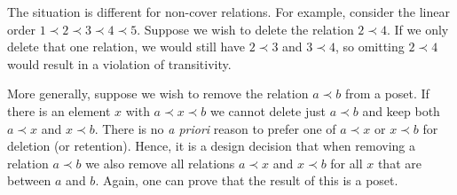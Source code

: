 \documentclass[12pt]{article}
\begin{document}
The situation is different for non-cover relations. For example,
consider the linear order $1\prec2\prec3\prec4\prec5$. Suppose we
wish to delete the relation $2\prec4$. If we only delete that one
relation, we would still have $2\prec3$ and $3\prec4$, so omitting
$2\prec4$ would result in a violation of transitivity. 

More generally, suppose we wish to remove the relation $a\prec b$ from
a poset. If there is an element $x$ with $a\prec x\prec b$ we cannot
delete just $a\prec b$ and keep both $a \prec x$ and $x\prec b$. There
is no \emph{a priori} reason to prefer one of $a\prec x$ or $x \prec
b$ for deletion (or retention). Hence, it is a design decision that
when removing a relation $a \prec b$ we also remove all relations $a
\prec x$ and $x \prec b$ for all $x$ that are between $a$ and $b$. 
Again, one can prove that the result of this is a poset. 
\end{document}
